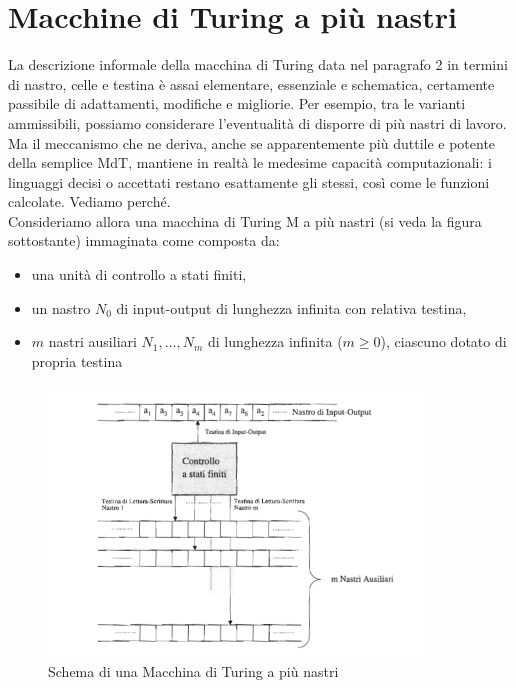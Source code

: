 \section{Macchine di Turing a più nastri}

La descrizione informale della macchina di Turing data nel paragrafo 2 in termini di
nastro, celle e testina è assai elementare, essenziale e schematica, certamente
passibile di adattamenti, modifiche e migliorie. Per esempio, tra le varianti
ammissibili, possiamo considerare l'eventualità di disporre di più nastri di lavoro.
Ma il meccanismo che ne deriva, anche se apparentemente più duttile e potente della
semplice MdT, mantiene in realtà le medesime capacità computazionali: i linguaggi
decisi o accettati restano esattamente gli stessi, così come le funzioni calcolate.
Vediamo perché.\\
Consideriamo allora una macchina di Turing M a più nastri (si veda la figura
sottostante) immaginata come composta da:

\begin{itemize}
    \item una unità di controllo a stati finiti,
    \item un nastro $N_0$ di input-output di lunghezza infinita con relativa testina,
    \item $m$ nastri ausiliari $N_1, \ldots, N_m$ di lunghezza infinita ($m \ge 0$),
          ciascuno dotato di propria testina
\end{itemize}

\begin{figure}[H]
    \centering
    \includegraphics[width=10cm, keepaspectratio]{capitoli/le_macchine_di_turing/imgs/mdt_piu_nastri.png}
    \caption{Schema di una Macchina di Turing a più nastri}
\end{figure}

